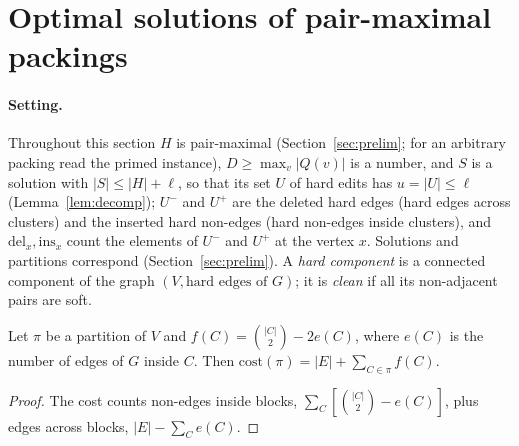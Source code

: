 \section{Optimal solutions of pair-maximal packings}\label{sec:optimal}
\paragraph{Setting.}
Throughout this section $H$ is pair-maximal (Section~\ref{sec:prelim}; for an arbitrary packing read the primed instance), $D\ge\max_v|Q(v)|$ is a number, and $S$ is a solution with $|S|\le|H|+\ell$, so that its set $U$ of hard edits has $u=|U|\le\ell$ (Lemma~\ref{lem:decomp}); $U^-$ and $U^+$ are the deleted hard edges (hard edges across clusters) and the inserted hard non-edges (hard non-edges inside clusters), and $\mathrm{del}_x,\mathrm{ins}_x$ count the elements of $U^-$ and $U^+$ at the vertex $x$. Solutions and partitions correspond (Section~\ref{sec:prelim}). A \emph{hard component} is a connected component of the graph $(V,\text{hard edges of }G)$; it is \emph{clean} if all its non-adjacent pairs are soft.

\begin{lemma}\label{lem:CP}
Let $\pi$ be a partition of $V$ and $f(C)=\binom{|C|}2-2e(C)$, where $e(C)$ is the number of edges of $G$ inside $C$. Then $\mathrm{cost}(\pi)=|E|+\sum_{C\in\pi}f(C)$.
\end{lemma}
\begin{proof}
The cost counts non-edges inside blocks, $\sum_C[\binom{|C|}2-e(C)]$, plus edges across blocks, $|E|-\sum_Ce(C)$.
\end{proof}

